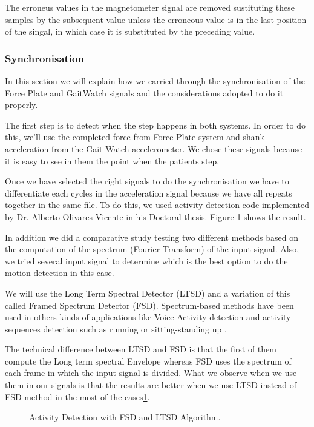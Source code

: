 The erroneus values in the magnetometer signal are removed sustituting these samples by the subsequent value unless the erroneous value is in the last position of the singal, in which case it is substituted by the preceding value.

\subsubsection{Synchronisation}	
In this section we will explain how we carried through the synchronisation of the Force Plate and GaitWatch signals and the considerations adopted to do it properly.

The first step is to detect when the step happens in both systems. In order to do this, we’ll use the completed force from Force Plate system and shank acceleration from the Gait Watch accelerometer. We chose these signals because it is easy to see in them the point when the patients step.

Once we have selected the right signals to do the synchronisation we have to differentiate each cycles in the acceleration signal because we have all repeats together in the same file. To do this, we used activity detection code implemented by Dr. Alberto Olivares Vicente in his Doctoral thesis. Figure \ref{fig:activityDetection} shows the result.

In addition we did a comparative study testing two different methods based on the  computation of the spectrum (Fourier Transform) of the input signal. Also, we tried several input signal to determine which is the best option to do the motion detection in this case.

We will use the Long Term Spectral Detector (LTSD) \cite{Ramirez2004} and a variation of this called Framed Spectrum Detector (FSD). Spectrum-based methods have been used in others kinds of applications like Voice Activity detection \cite{Ramirez2006}\cite{Ramirez2007} and activity sequences detection such as running or sitting-standing up\cite{A.Olivares2013} .

The technical difference between LTSD and FSD is that the first of them compute the Long term spectral Envelope whereas FSD uses the spectrum of each frame  in which the input signal is divided\cite{A.Olivares2013}. What we observe when we use them in our signals is that the results are better when we use LTSD instead of FSD method  in the most of the cases\ref{fig:activityDetection}.

\begin{figure}[H]
	\centering
	\caption{Activity Detection with FSD and LTSD Algorithm.}
	\label{fig:activityDetection}
\end{figure} 

